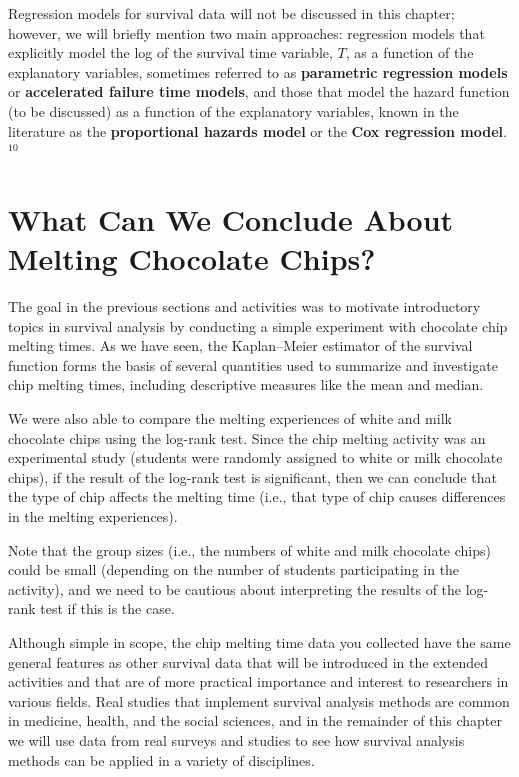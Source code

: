 \documentclass[
]{report}
\begin{document}
Regression models for survival data will not be discussed in this chapter; however, we will briefly mention two main approaches: regression models that explicitly model the log of the survival time variable, \(T\), as a function of the explanatory variables, sometimes referred to as \textbf{parametric regression models} or \textbf{accelerated failure time models}, and those that model the hazard function (to be discussed) as a function of the explanatory variables, known in the literature as the \textbf{proportional hazards model} or the \textbf{Cox regression model}.\(^10\)

\section{\texorpdfstring{\textbf{What Can We Conclude About Melting Chocolate Chips?}}{What Can We Conclude About Melting Chocolate Chips?}}\label{what-can-we-conclude-about-melting-chocolate-chips}

The goal in the previous sections and activities was to motivate introductory topics in survival analysis by conducting a simple experiment with chocolate chip melting times. As we have seen, the Kaplan--Meier estimator of the survival function forms the basis of several quantities used to summarize and investigate chip melting times, including descriptive measures like the mean and median.

We were also able to compare the melting experiences of white and milk chocolate chips using the log-rank test. Since the chip melting activity was an experimental study (students were randomly assigned to white or milk chocolate chips), if the result of the log-rank test is significant, then we can conclude that the type of chip affects the melting time (i.e., that type of chip causes differences in the melting experiences).

Note that the group sizes (i.e., the numbers of white and milk chocolate chips) could be small (depending on the number of students participating in the activity), and we need to be cautious about interpreting the results of the log-rank test if this is the case.

Although simple in scope, the chip melting time data you collected have the same general features as other survival data that will be introduced in the extended activities and that are of more practical importance and interest to researchers in various fields. Real studies that implement survival analysis methods are common in medicine, health, and the social sciences, and in the remainder of this chapter we will use data from real surveys and studies to see how survival analysis methods can be applied in a variety of disciplines.
\end{document}
